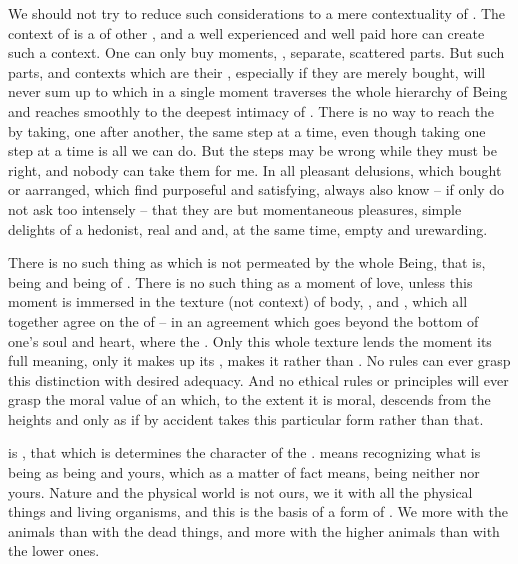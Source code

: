 \pa %
We should not try to reduce such considerations to a mere
contextuality of .  The context of  is a  of other , and a
well experienced and well paid hore can create such a context.  One
can only buy moments, , separate, scattered parts. 
But such parts, and contexts which are their ,
especially if they are merely bought, will never sum up to
 which in a single moment traverses the whole
hierarchy of Being and reaches smoothly to the deepest intimacy of
.  There is no way to reach the 
by taking, one after another, the same step at a time, even though
taking one step at a time is all we can do.  But the steps may be
wrong while they must be right, and nobody can take them for me.  In
all pleasant delusions, which  bought or aarranged, which 
find purposeful and satisfying,  always also know -- if only
 do not ask too intensely -- that they are but momentaneous
pleasures, simple delights of a hedonist, real and  and, at
the same time, empty and urewarding.

\pa There is no such thing as  which is not
permeated by the whole Being, that is,  being and being of
.  There is no such thing as a moment of love, unless this
moment is immersed in the texture (not context) of body, ,
 and , which all together agree on the
 of  -- in an agreement which goes beyond the
bottom of one's soul and heart, where the .  Only
this whole texture lends the  moment its full meaning, only
it makes up its , makes it  rather than . No  rules can ever 
grasp this distinction with desired adequacy. And no ethical rules or 
principles will ever grasp the moral value of an  which, to 
the extent it is moral, descends from the  heights and 
only as if by accident takes this particular form rather than that.



\pa
{} is , that which is 
 determines the character of the . 
 means recognizing what is being 
as being  and yours, which as a matter of
fact means, being neither  nor yours.  Nature and the
physical world is not ours, we  it with all the physical
things and living organisms, and this is the basis of a form of
.  We  more with the animals than with the
dead things, and more with the higher animals than with the lower
ones. 

